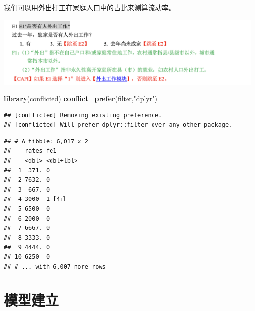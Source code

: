 \documentclass[
]{book}
\newenvironment{Shaded}{\begin{snugshade}}{\end{snugshade}}
\newcommand{\DecValTok}[1]{\textcolor[rgb]{0.00,0.00,0.81}{#1}}
\newcommand{\FunctionTok}[1]{\textcolor[rgb]{0.13,0.29,0.53}{\textbf{#1}}}
\newcommand{\NormalTok}[1]{#1}
\newcommand{\OtherTok}[1]{\textcolor[rgb]{0.56,0.35,0.01}{#1}}
\newcommand{\SpecialCharTok}[1]{\textcolor[rgb]{0.81,0.36,0.00}{\textbf{#1}}}
\newcommand{\StringTok}[1]{\textcolor[rgb]{0.31,0.60,0.02}{#1}}
\begin{document}
我们可以用外出打工在家庭人口中的占比来测算流动率。

\includegraphics{image/fe1.png}

\begin{Shaded}
\begin{Highlighting}[]
\FunctionTok{library}\NormalTok{(conflicted)}
\FunctionTok{conflict\_prefer}\NormalTok{(}\StringTok{\textquotesingle{}filter\textquotesingle{}}\NormalTok{,}\StringTok{"dplyr"}\NormalTok{)}
\end{Highlighting}
\end{Shaded}

\begin{verbatim}
## [conflicted] Removing existing preference.
## [conflicted] Will prefer dplyr::filter over any other package.
\end{verbatim}

\begin{Shaded}
\end{Shaded}

\begin{verbatim}
## # A tibble: 6,017 x 2
##    rates fe1      
##    <dbl> <dbl+lbl>
##  1  371. 0        
##  2 7632. 0        
##  3  667. 0        
##  4 3000  1 [有]   
##  5 6500  0        
##  6 2000  0        
##  7 6667. 0        
##  8 3333. 0        
##  9 4444. 0        
## 10 6250  0        
## # ... with 6,007 more rows
\end{verbatim}

\hypertarget{ux6a21ux578bux5efaux7acb}{%
\section{模型建立}\label{ux6a21ux578bux5efaux7acb}}
\end{document}
